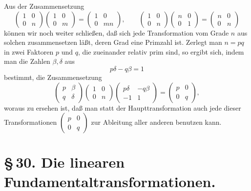 \documentclass[11pt]{article}
\begin{document}
Aus der Zusammensetzung
\begin{equation}
\begin{pmatrix}1&0\\0&n\end{pmatrix}
\begin{pmatrix}1&0\\0&m\end{pmatrix}
=\begin{pmatrix}1&0\\0&mn\end{pmatrix},
\qquad
\begin{pmatrix}1&0\\0&n\end{pmatrix}
\begin{pmatrix}n&0\\0&1\end{pmatrix}
=\begin{pmatrix}n&0\\0&n\end{pmatrix} \tag{7}
\end{equation}
können wir noch weiter schließen, daß sich jede Transformation vom Grade $n$ aus solchen zusammensetzen läßt, deren Grad eine Primzahl ist. Zerlegt man $n=pq$ in zwei Faktoren $p$ und $q$, die zueinander relativ prim sind, so ergibt sich, indem man die Zahlen $\beta,\delta$ aus
\[
p\delta-q\beta=1
\]
bestimmt, die Zusammensetzung
\[
\begin{pmatrix}p&\beta\\ q&\delta\end{pmatrix}
\begin{pmatrix}1&0\\0&n\end{pmatrix}
\begin{pmatrix}p\delta&-q\beta\\ -1&1\end{pmatrix}
=\begin{pmatrix}p&0\\0&q\end{pmatrix},
\]
woraus zu ersehen ist, daß man statt der Haupttransformation auch jede dieser Transformationen $\begin{pmatrix}p&0\\0&q\end{pmatrix}$ zur Ableitung aller anderen benutzen kann.

\section*{\S\,30. Die linearen Fundamentaltransformationen.}
\end{document}
